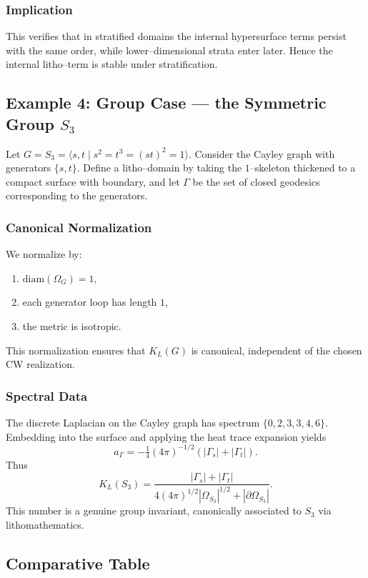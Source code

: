 \subsubsection*{Implication}
This verifies that in stratified domains the internal hypersurface terms 
persist with the same order, while lower--dimensional strata enter later. 
Hence the internal litho--term is stable under stratification. 

\subsection{Example 4: Group Case --- the Symmetric Group $S_3$}

Let $G=S_3=\langle s,t \mid s^2=t^3=(st)^2=1 \rangle$. 
Consider the Cayley graph with generators $\{s,t\}$. 
Define a litho--domain by taking the $1$--skeleton thickened to a 
compact surface with boundary, and let $\Gamma$ be the set of closed geodesics 
corresponding to the generators. 

\subsubsection*{Canonical Normalization}
We normalize by:
\begin{enumerate}
\item $\mathrm{diam}(\Omega_G)=1$,
\item each generator loop has length $1$,
\item the metric is isotropic. 
\end{enumerate}
This normalization ensures that $K_L(G)$ is canonical, 
independent of the chosen CW realization. 

\subsubsection*{Spectral Data}
The discrete Laplacian on the Cayley graph has spectrum 
$\{0,2,3,3,4,6\}$. 
Embedding into the surface and applying the heat trace expansion yields 
\[
a_\Gamma = -\tfrac{1}{4}(4\pi)^{-1/2}(|\Gamma_s|+|\Gamma_t|).
\]
Thus
\[
K_L(S_3) = 
\frac{|\Gamma_s|+|\Gamma_t|}{4(4\pi)^{1/2}|\Omega_{S_3}|^{1/2}+|\partial\Omega_{S_3}|}.
\]
This number is a genuine group invariant, canonically associated 
to $S_3$ via lithomathematics.

\subsection{Comparative Table}

